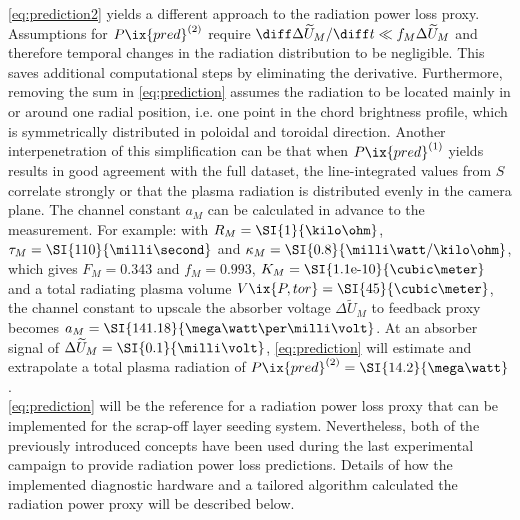         \autoref{eq:prediction2} yields a different approach to the radiation power loss proxy. Assumptions for $P\ix{pred}^{\left(2\right)}$ require $\diff\Delta\widetilde{U}_{M}/\diff t\ll f_{M}\Delta\widetilde{U}_{M}$ and therefore temporal changes in the radiation distribution to be negligible. This saves additional computational steps by eliminating the derivative. Furthermore, removing the sum in \cref{eq:prediction} assumes the radiation to be located mainly in or around one radial position, i.e. one point in the chord brightness profile, which is symmetrically distributed in poloidal and toroidal direction. Another interpenetration of this simplification can be that when $P\ix{pred}^{\left(1\right)}$ yields results in good agreement with the full dataset, the line-integrated values from $S$ correlate strongly or that the plasma radiation is distributed evenly in the camera plane. The channel constant $a_{M}$ can be calculated in advance to the measurement. For example: with $R_{M}=\text{\SI{1}{\kilo\ohm}}$, $\tau_{M}=\text{\SI{110}{\milli\second}}$ and $\kappa_{M}=\text{\SI{0.8}{\milli\watt/\kilo\ohm}}$, which gives $F_{M}=0.343$ and $f_{M}=0.993$, $K_{M}=\text{\SI{1.1e-10}{\cubic\meter}}$ and a total radiating plasma volume $V\ix{P, tor}=\text{\SI{45}{\cubic\meter}}$, the channel constant to upscale the absorber voltage $\Delta\widetilde{U}_{M}$ to feedback proxy becomes $a_{M}=\text{\SI{141.18}{\mega\watt\per\milli\volt}}$. At an absorber signal of $\Delta\widetilde{U}_{M}=\text{\SI{0.1}{\milli\volt}}$, \cref{eq:prediction} will estimate and extrapolate a total plasma radiation of $P\ix{pred}^{\left(2\right)}=\text{\SI{14.2}{\mega\watt}}$.\\%
        \autoref{eq:prediction} will be the reference for a radiation power loss proxy that can be implemented for the scrap-off layer seeding system. Nevertheless, both of the previously introduced concepts have been used during the last experimental campaign to provide radiation power loss predictions. Details of how the implemented diagnostic hardware and a tailored algorithm calculated the radiation power proxy will be described below.\\%
